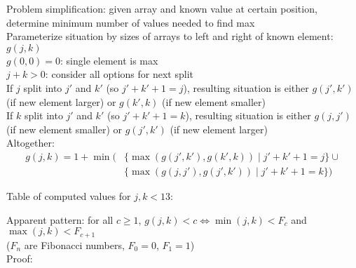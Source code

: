 \documentclass{article}
\begin{document}
Problem simplification: given array
and known value at certain position,
determine minimum number of values needed to find max \\
Parameterize situation by sizes of arrays to left and right of known element:
$g(j, k)$ \\
$g(0, 0) = 0$: single element is max \\
$j+k > 0$: consider all options for next split \\
If $j$ split into $j'$ and $k'$ (so $j'+k'+1=j$),
resulting situation is either
$g(j', k')$ (if new element larger) or $g(k', k)$ (if new element smaller) \\
If $k$ split into $j'$ and $k'$ (so $j'+k'+1=k$),
resulting situation is either
$g(j, j')$ (if new element smaller) or $g(j', k')$ (if new element larger) \\
Altogether:
\begin{align*}
  g(j, k) = 1 + \min(
  & \{\max(g(j', k'), g(k', k)) \mid j'+k'+1 = j\} \cup \\
  & \{\max(g(j, j'), g(j', k')) \mid j'+k'+1 = k\})
\end{align*}
\begin{center}
Table of computed values for $j, k < 13$: \\
\end{center}
Apparent pattern: for all $c \geq 1$,
$g(j, k) < c \iff \min(j, k) < F_c$ and $\max(j, k) < F_{c+1}$ \\
($F_n$ are Fibonacci numbers, $F_0 = 0$, $F_1 = 1$) \\
Proof: \\
\end{document}
